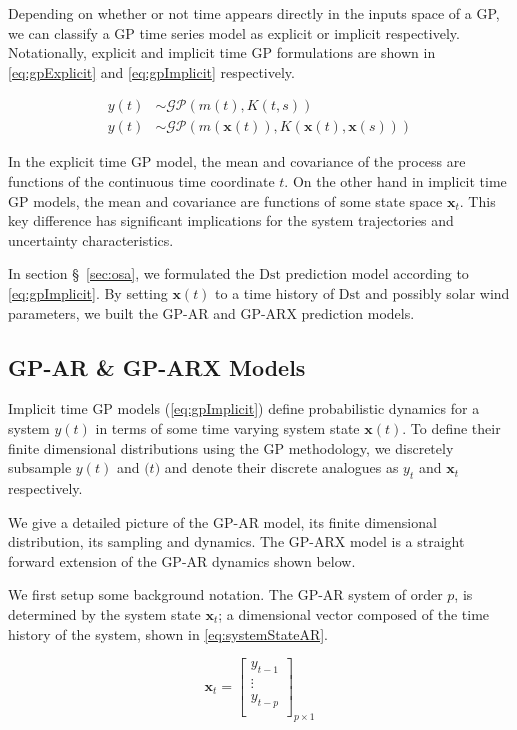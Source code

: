 Depending on whether or not time appears directly in the inputs space of a GP, we can classify a GP time series 
model as explicit or implicit respectively. Notationally, explicit and implicit time GP formulations are shown 
in \cref{eq:gpExplicit} and \cref{eq:gpImplicit} respectively.

\begin{align}
    y(t) &\sim \mathcal{GP}(m(t), K(t, s)) \label{eq:gpExplicit}\\
    y(t) &\sim \mathcal{GP}(m(\mathbf{x}(t)), K(\mathbf{x}(t), \mathbf{x}(s))) \label{eq:gpImplicit}
\end{align}

In the explicit time GP model, the mean and covariance of the process are functions of the continuous time 
coordinate $t$. On the other hand in implicit time GP models, the mean and covariance are functions of some 
state space $\mathbf{x}_t$. This key difference has significant implications for the system trajectories and 
uncertainty characteristics.

In section \S~\ref{sec:osa}, we formulated the $\mathrm{Dst}$ prediction model according to \cref{eq:gpImplicit}. 
By setting $\mathbf{x}(t)$ to a time history of $\mathrm{Dst}$ and possibly solar wind parameters, we built the 
GP-AR and GP-ARX prediction models.


\subsection*{GP-AR \& GP-ARX Models}

Implicit time GP models (\cref{eq:gpImplicit}) define probabilistic dynamics for a system $y(t)$ in terms
of some time varying system state $\mathbf{x}(t)$. To define their finite dimensional distributions using the 
GP methodology, we discretely subsample $y(t)$ and $\mathbf(t)$ and denote their discrete analogues as $y_t$ and 
$\mathbf{x}_t$ respectively.  

We give a detailed picture of the GP-AR model, its finite dimensional distribution, its sampling and dynamics. 
The GP-ARX model is a straight forward extension of the GP-AR dynamics shown below.

We first setup some background notation. The GP-AR system of order $p$, is determined by the system state 
$\mathbf{x}_t$; a dimensional vector composed of the time history of the system, shown in \cref{eq:systemStateAR}.

\begin{equation}\label{eq:systemStateAR}
    \mathbf{x}_t = \begin{bmatrix}
        y_{t-1}\\ 
        \vdots\\ 
        y_{t-p}\\ 
        \end{bmatrix}_{p \times 1}
\end{equation}

